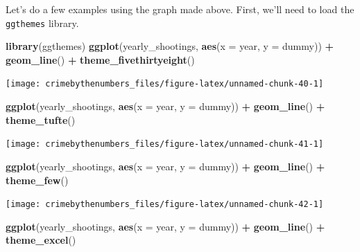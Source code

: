 \documentclass[
  12pt,
]{book}
\newenvironment{Shaded}{\begin{snugshade}}{\end{snugshade}}
\newcommand{\DataTypeTok}[1]{\textcolor[rgb]{0.27,0.27,0.27}{#1}}
\newcommand{\KeywordTok}[1]{\textcolor[rgb]{0.27,0.27,0.27}{\textbf{#1}}}
\newcommand{\NormalTok}[1]{#1}
\newcommand{\OperatorTok}[1]{\textcolor[rgb]{0.43,0.43,0.43}{\textbf{#1}}}
\newcommand{\StringTok}[1]{\textcolor[rgb]{0.5,0.5,0.5}{#1}}
\begin{document}
Let's do a few examples using the graph made above. First, we'll need to load the \texttt{ggthemes} library.

\begin{Shaded}
\begin{Highlighting}[]
\KeywordTok{library}\NormalTok{(ggthemes)}
\KeywordTok{ggplot}\NormalTok{(yearly\_shootings, }\KeywordTok{aes}\NormalTok{(}\DataTypeTok{x =}\NormalTok{ year, }\DataTypeTok{y =}\NormalTok{ dummy)) }\OperatorTok{+}
\StringTok{  }\KeywordTok{geom\_line}\NormalTok{() }\OperatorTok{+}
\StringTok{  }\KeywordTok{theme\_fivethirtyeight}\NormalTok{()}
\end{Highlighting}
\end{Shaded}

\begin{center}\texttt{[image: crimebythenumbers\_files/figure-latex/unnamed-chunk-40-1]} \end{center}

\begin{Shaded}
\begin{Highlighting}[]
\KeywordTok{ggplot}\NormalTok{(yearly\_shootings, }\KeywordTok{aes}\NormalTok{(}\DataTypeTok{x =}\NormalTok{ year, }\DataTypeTok{y =}\NormalTok{ dummy)) }\OperatorTok{+}
\StringTok{  }\KeywordTok{geom\_line}\NormalTok{() }\OperatorTok{+}
\StringTok{  }\KeywordTok{theme\_tufte}\NormalTok{()}
\end{Highlighting}
\end{Shaded}

\begin{center}\texttt{[image: crimebythenumbers\_files/figure-latex/unnamed-chunk-41-1]} \end{center}

\begin{Shaded}
\begin{Highlighting}[]
\KeywordTok{ggplot}\NormalTok{(yearly\_shootings, }\KeywordTok{aes}\NormalTok{(}\DataTypeTok{x =}\NormalTok{ year, }\DataTypeTok{y =}\NormalTok{ dummy)) }\OperatorTok{+}
\StringTok{  }\KeywordTok{geom\_line}\NormalTok{() }\OperatorTok{+}
\StringTok{  }\KeywordTok{theme\_few}\NormalTok{()}
\end{Highlighting}
\end{Shaded}

\begin{center}\texttt{[image: crimebythenumbers\_files/figure-latex/unnamed-chunk-42-1]} \end{center}

\begin{Shaded}
\begin{Highlighting}[]
\KeywordTok{ggplot}\NormalTok{(yearly\_shootings, }\KeywordTok{aes}\NormalTok{(}\DataTypeTok{x =}\NormalTok{ year, }\DataTypeTok{y =}\NormalTok{ dummy)) }\OperatorTok{+}
\StringTok{  }\KeywordTok{geom\_line}\NormalTok{() }\OperatorTok{+}
\StringTok{  }\KeywordTok{theme\_excel}\NormalTok{()}
\end{Highlighting}
\end{Shaded}
\end{document}
